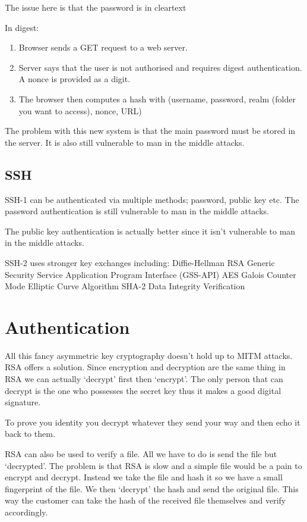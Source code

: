 \documentclass{report}
\begin{document}
The issue here is that the password is in cleartext

In digest:
\begin{enumerate}
    \item Browser sends a GET request to a web server.
    \item Server says that the user is not authorised and requires digest
        authentication. A nonce is provided as a digit.
    \item The browser then computes a hash with
        (username, password, realm (folder you want to access), nonce, URL)
\end{enumerate}

The problem with this new system is that the main password must be stored
in the server. It is also still vulnerable to man in the middle attacks.

\section{SSH}
SSH-1 can be authenticated via multiple methods; password, public key etc.
The password authentication is still vulnerable to man in the middle attacks.

The public key authentication is actually better since it isn't vulnerable
to man in the middle attacks.

SSH-2 uses stronger key exchanges including:
Diffie-Hellman
RSA
Generic Security Service Application Program Interface (GSS-API)
AES Galois Counter Mode
Elliptic Curve Algorithm
SHA-2 Data Integrity Verification

\chapter{Authentication}
All this fancy asymmetric key cryptography doesn't hold up to MITM attacks.
RSA offers a solution. Since encryption and decryption are the same thing in RSA
we can actually `decrypt' first then `encrypt'. The only person that can decrypt
is the one who possesses the secret key thus it makes a good digital signature.

To prove you identity you decrypt whatever they send your way and then echo it
back to them.

RSA can also be used to verify a file. All we have to do is send the file but
`decrypted'. The problem is that RSA is slow and a simple file would be a pain
to encrypt and decrypt. Instead we take the file and hash it so we have a small
fingerprint of the file. We then `decrypt' the hash and send the original file.
This way the customer can take the hash of the received file themselves and
verify accordingly.
\end{document}
